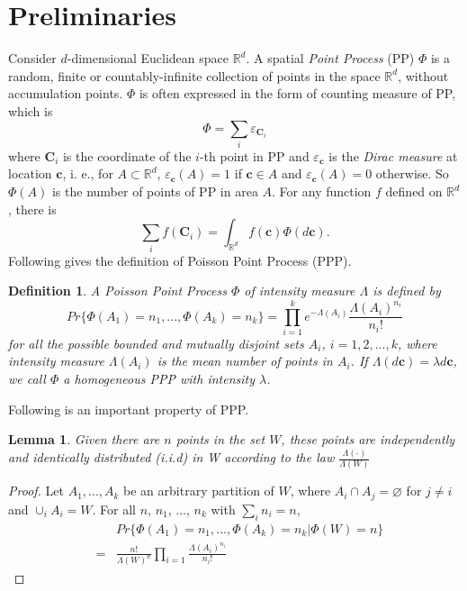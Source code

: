 \documentclass[a4paper,twocolumn]{IEEEtran}
\newtheorem{definition}{\textbf{Definition}}
\newtheorem{lemma}{\textbf{Lemma}}
\begin{document}
\section{Preliminaries}\label{Sec:Preli}
Consider $d$-dimensional Euclidean space $\mathbb{R}^d$. A spatial \emph{Point Process} (PP) $\Phi$ is a random, finite or countably-infinite collection of points in the space $\mathbb{R}^d$, without accumulation points. $\Phi$ is often expressed in the form of counting measure of PP, which is
\begin{displaymath}
\Phi = \sum_i \varepsilon_{\bm{C}_i}
\end{displaymath} 
where $\bm{C}_i$ is the coordinate of the $i$-th point in PP and $\varepsilon_{\bm{c}}$ is the \emph{Dirac measure} at location $\bm{c}$, i. e., for $A \subset \mathbb{R}^d$, $\varepsilon_{\bm{c}}(A)=1$ if $\bm{c} \in A$ and $\varepsilon_{\bm{c}}(A)=0$ otherwise. So $\Phi(A)$ is the number of points of PP in area $A$. For any function $f$ defined on $\mathbb{R}^d$, there is   
\begin{displaymath}
\sum_i f(\bm{C}_i) = \int_{\mathbb{R}^d}f(\bm{c})\Phi(d\bm{c}).
\end{displaymath}
Following gives the definition of Poisson Point Process (PPP).
\begin{definition}
A Poisson Point Process $\Phi$ of intensity measure $\Lambda$ is defined by
\begin{equation}
Pr\{\Phi(A_1) = n_1, ..., \Phi(A_k) = n_k\} = \prod_{i=1}^{k} e^{-\Lambda(A_i)}\frac{\Lambda(A_i)^{n_i}}{n_i !}
\end{equation}
for all the possible bounded and mutually disjoint sets $A_i$, $i = 1,2, ..., k$, where intensity measure $\Lambda(A_i)$ is the mean number of points in $A_i$. If $\Lambda(d\bm{c}) = \lambda d\bm{c}$, we call $\Phi$ a homogeneous PPP with intensity $\lambda$.  
\end{definition}

Following is an important property of PPP.
\begin{lemma}
	Given there are $n$ points in the set $W$, these points are independently and identically distributed (i.i.d) in W according to the law $\frac{\Lambda(\cdot)}{\Lambda(W)}$
\end{lemma}
\begin{proof}
	Let $A_1, ..., A_k$ be an arbitrary partition of $W$, where $A_i \cap A_j = \varnothing$ for $j \neq i$ and $\cup_i A_i = W$. For all $n$, $n_1$, ..., $n_k$ with $\sum_i n_i = n$,
	\begin{eqnarray}
	&&Pr\{\Phi(A_1) = n_1, ..., \Phi(A_k) = n_k | \Phi(W) = n\}\nonumber\\
	&=&\frac{n!}{\Lambda(W)^n}\prod_{i=1}\frac{\Lambda(A_i)^{n_i}}{n_i!}\nonumber
	\end{eqnarray}
\end{proof}
\end{document}

